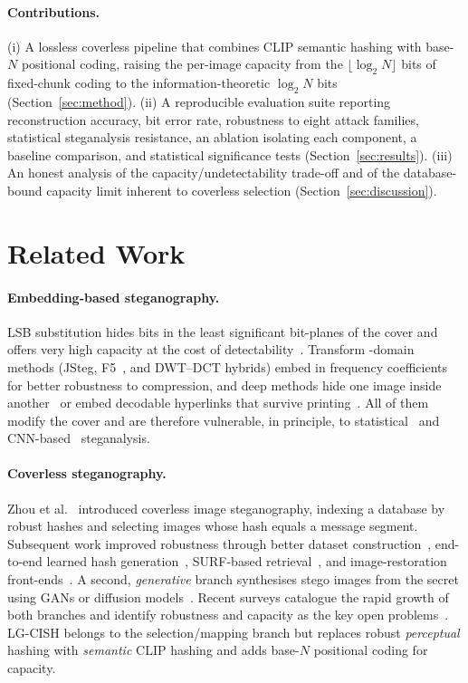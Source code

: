 \documentclass[10pt]{article}
\begin{document}
\paragraph{Contributions.}
(i) A lossless coverless pipeline that combines CLIP semantic hashing with
base-$N$ positional coding, raising the per-image capacity from the
$\lfloor\log_2 N\rfloor$ bits of fixed-chunk coding to the information-theoretic
$\log_2 N$ bits (Section~\ref{sec:method}).
(ii) A reproducible evaluation suite reporting reconstruction accuracy, bit error
rate, robustness to eight attack families, statistical steganalysis resistance,
an ablation isolating each component, a baseline comparison, and statistical
significance tests (Section~\ref{sec:results}).
(iii) An honest analysis of the capacity/undetectability trade-off and of the
database-bound capacity limit inherent to coverless selection
(Section~\ref{sec:discussion}).

\section{Related Work}\label{sec:related}
\paragraph{Embedding-based steganography.}
LSB substitution hides bits in the least significant bit-planes of the cover and
offers very high capacity at the cost of detectability~\cite{chan2004}. Transform
-domain methods (JSteg, F5~\cite{westfeld2001f5}, and DWT--DCT hybrids) embed in
frequency coefficients for better robustness to compression, and deep methods
hide one image inside another~\cite{baluja2017} or embed decodable hyperlinks
that survive printing~\cite{tancik2020}. All of them modify the cover and are
therefore vulnerable, in principle, to statistical~\cite{westfeld1999,fridrich2001}
and CNN-based~\cite{xu2016,boroumand2019} steganalysis.

\paragraph{Coverless steganography.}
Zhou et al.~\cite{zhou2015} introduced coverless image steganography, indexing a
database by robust hashes and selecting images whose hash equals a message
segment. Subsequent work improved robustness through better dataset
construction~\cite{neglected2022}, end-to-end learned hash
generation~\cite{end2endHash2023}, SURF-based retrieval~\cite{surf2024}, and
image-restoration front-ends~\cite{restoration2024}. A second, \emph{generative}
branch synthesises stego images from the secret using GANs or diffusion
models~\cite{imageMapping2024,diffstega2024}. Recent surveys catalogue the rapid
growth of both branches and identify robustness and capacity as the key open
problems~\cite{coverlessSurvey2024,dlSurvey2024}. LG-CISH belongs to the
selection/mapping branch but replaces robust \emph{perceptual} hashing with
\emph{semantic} CLIP hashing and adds base-$N$ positional coding for capacity.
\end{document}
